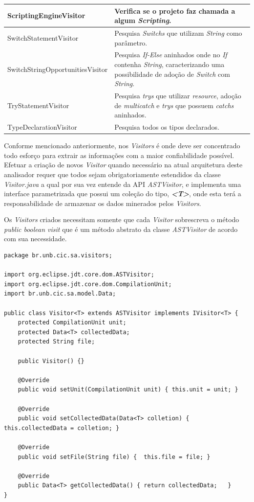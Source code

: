 \begin{table}[ht!]
\begin{tabular}{ >{\arraybackslash}p{2.2in} | >{\arraybackslash}m{3.8in} }
			ScriptingEngineVisitor & Verifica se o projeto faz chamada a algum \textit{Scripting}.\\ \hline
			
			SwitchStatementVisitor & Pesquisa \textit{Switchs} que utilizam \textit{String} como parâmetro.\\ \hline
			
			SwitchStringOpportunitiesVisitor &  Pesquisa \textit{If-Else} aninhados onde no \textit{If} contenha \textit{String}, caracterizando uma possibilidade de adoção de \textit{Switch} com \textit{String}.\\ \hline
		
			TryStatementVisitor & Pesquisa \textit{trys} que utilizar \textit{resource}, adoção de \textit{multicatch} e \textit{trys} que possuem \textit{catchs} aninhados.\\ \hline
			
			TypeDeclarationVisitor & Pesquisa todos os tipos declarados.\\ \hline 		
		\end{tabular}
\end{table}


Conforme mencionado anteriormente, nos \textit{Visitors} é onde deve ser concentrado todo esforço para extrair as informações com a maior confiabilidade possível. Efetuar a criação de novos \textit{Visitor} quando necessário na atual arquitetura deste analisador requer que todos sejam  obrigatoriamente estendidos da classe \textit{Visitor.java} a qual por sua vez entende da \acs{API}  \textit{ASTVisitor}, e implementa uma interface parametrizada que possui um coleção do tipo, \textit{\textbf{<T>}}, onde esta terá a responsabilidade de armazenar os dados minerados pelos \textit{Visitors}. 

Os \textit{Visitors} criados necessitam somente que cada \textit{Visitor} sobrescreva o método \textit{public boolean visit} que é um método abstrato da classe \textit{ASTVisitor} de acordo com sua necessidade.

\begin{lstlisting}
package br.unb.cic.sa.visitors;

import org.eclipse.jdt.core.dom.ASTVisitor;
import org.eclipse.jdt.core.dom.CompilationUnit;
import br.unb.cic.sa.model.Data;

public class Visitor<T> extends ASTVisitor implements IVisitor<T> {
	protected CompilationUnit unit;
	protected Data<T> collectedData;
	protected String file;
	
	public Visitor() {}
	
	@Override
	public void setUnit(CompilationUnit unit) { this.unit = unit; }
	
	@Override
	public void setCollectedData(Data<T> colletion) { this.collectedData = colletion; }
	
	@Override
	public void setFile(String file) {	this.file = file; }

	@Override
	public Data<T> getCollectedData() {	return collectedData;	}	
}
\end{lstlisting}


